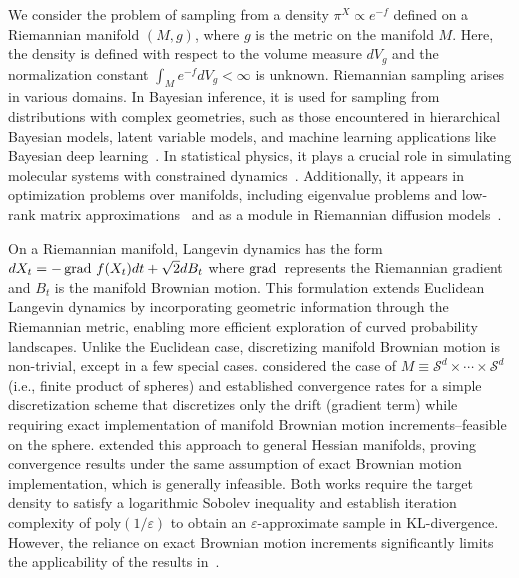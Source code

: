 
We consider the problem of sampling from a density $\pi^{X} \propto e^{-f}$ defined on a Riemannian manifold $(M,g)$, where $g$ is the metric on the manifold $M$. Here, the density is defined with respect to the volume measure $dV_g$ and the normalization constant $\int_M e^{-f} dV_g <\infty$ is unknown. Riemannian sampling arises in various domains. In Bayesian inference, it is used for sampling from distributions with complex geometries, such as those encountered in hierarchical Bayesian models, latent variable models, and machine learning applications like Bayesian deep learning~\citep{girolami2011riemann, byrne2013geodesic, patterson2013stochastic, liu2018riemannian, arnaudon2019irreversible, liu2016stochastic, piggott2016geometric, muniz2022higher, lie2023dimension}. In statistical physics, it plays a crucial role in simulating molecular systems with constrained dynamics~\citep{leimkuhler2016efficient}. Additionally, it appears in optimization problems over manifolds, including eigenvalue problems and low-rank matrix approximations~\citep{goyal2019sampling,li2023riemannian, yu2023riemannian, bonet2023spherical} and as a module in Riemannian diffusion models~\citep{de2022riemannian,huang2022riemannian}.



On a Riemannian manifold, Langevin dynamics has the form $dX_{t} = - \operatorname{grad\,} f(X_{t})dt + \sqrt{2} dB_{t} $ where $\operatorname{grad\,}$ represents the Riemannian gradient and $B_{t}$ is the manifold Brownian motion. This formulation extends Euclidean Langevin dynamics by incorporating geometric information through the Riemannian metric, enabling more efficient exploration of curved probability landscapes. Unlike the Euclidean case, discretizing manifold Brownian motion is non-trivial, except in a few special cases. \cite{li2023riemannian} considered the case of $M \equiv \mathcal{S}^d\times\cdots\times\mathcal{S}^d$ (i.e., finite product of spheres) and established convergence rates for a simple discretization scheme that discretizes only the drift (gradient term) while requiring exact implementation of manifold Brownian motion increments--feasible on the sphere. \cite{gatmiry2022convergence} extended this approach to general Hessian manifolds, proving convergence results under the same assumption of exact Brownian motion implementation, which is generally infeasible. Both works require the target density to satisfy a logarithmic Sobolev inequality and establish iteration complexity of 
$\text{poly}(1/\varepsilon)$  to obtain an $\varepsilon$-approximate sample in KL-divergence. However, the reliance on exact Brownian motion increments significantly limits the applicability of the results in~\cite{gatmiry2022convergence}.



